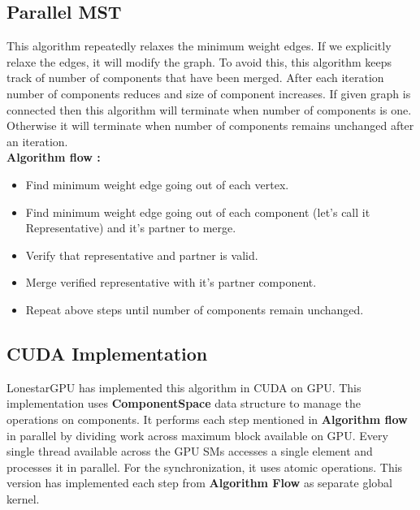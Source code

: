 \documentclass{article}
\begin{document}
\subsection{Parallel MST}

This algorithm repeatedly relaxes the minimum weight edges. If we explicitly relaxe the edges, it will modify the graph. To avoid this, this algorithm keeps track of number of components that have been merged. After each iteration number of components reduces and size of component increases. If given graph is connected then this algorithm will terminate when number of components is one. Otherwise it will terminate when number of components remains unchanged after an iteration. \\

\textbf{ Algorithm flow : } 
\begin{itemize}
\item Find minimum weight edge going out of each vertex. \\
\item Find minimum weight edge going out of each component (let's call it Representative) and it's partner to merge. \\
\item Verify that representative and partner is valid. \\
\item Merge verified representative with it's partner component. \\
\item Repeat above steps until number of components remain unchanged. \\
\end{itemize}



\subsection{CUDA Implementation}

LonestarGPU has implemented this algorithm in CUDA on GPU. This implementation uses \textbf{ComponentSpace} data structure to manage the operations on components. It performs each step mentioned in \textbf{Algorithm flow} in parallel by dividing work across maximum block available on GPU. Every single thread available across the GPU SMs accesses a single element and processes it in parallel. For the synchronization, it uses atomic operations. This version has implemented each step from \textbf{Algorithm Flow} as separate global kernel.  
\end{document}
